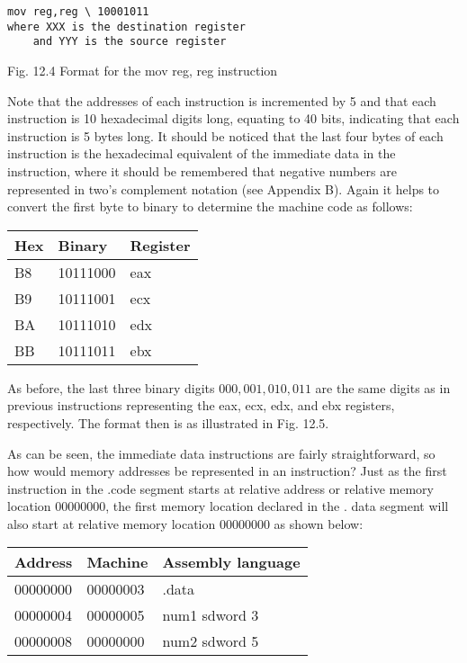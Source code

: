 \documentclass[10pt]{article}
\begin{document}
\begin{verbatim}
mov reg,reg \ 10001011
where XXX is the destination register
    and YYY is the source register
\end{verbatim}

Fig. 12.4 Format for the mov reg, reg instruction

Note that the addresses of each instruction is incremented by 5 and that each instruction is 10 hexadecimal digits long, equating to 40 bits, indicating that each instruction is 5 bytes long. It should be noticed that the last four bytes of each instruction is the hexadecimal equivalent of the immediate data in the instruction, where it should be remembered that negative numbers are represented in two's complement notation (see Appendix B). Again it helps to convert the first byte to binary to determine the machine code as follows:

\begin{center}
\begin{tabular}{|l|l|l|}
\hline
Hex & Binary & Register \\
\hline
B8 & 10111000 & eax \\
\hline
B9 & 10111001 & ecx \\
\hline
BA & 10111010 & edx \\
\hline
BB & 10111011 & ebx \\
\hline
\end{tabular}
\end{center}

As before, the last three binary digits $000,001,010,011$ are the same digits as in previous instructions representing the eax, ecx, edx, and ebx registers, respectively. The format then is as illustrated in Fig. 12.5.

As can be seen, the immediate data instructions are fairly straightforward, so how would memory addresses be represented in an instruction? Just as the first instruction in the .code segment starts at relative address or relative memory location 00000000, the first memory location declared in the . data segment will also start at relative memory location 00000000 as shown below:

\begin{center}
\begin{tabular}{|l|l|l|}
\hline
Address & Machine & Assembly language \\
\hline
00000000 & 00000003 & .data \\
\hline
00000004 & 00000005 & num1 sdword 3 \\
\hline
00000008 & 00000000 & num2 sdword 5 \\
\hline
\end{tabular}
\end{center}
\end{document}

